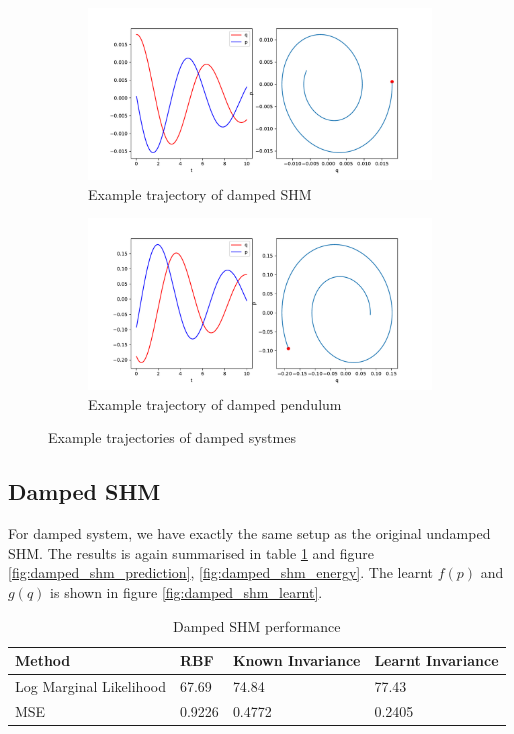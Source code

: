 \documentclass{statsmsc}
\begin{document}
\begin{figure}[H]
     \centering
     \begin{subfigure}[b]{\linewidth}
        \centering
        \includegraphics[width=0.5\linewidth]{../codes/figures/damped_shm_trajectory_1D.pdf}
        \caption{Example trajectory of damped SHM}
        \label{fig:damped_shm_trajectory}
     \end{subfigure}
     \hfill
     \begin{subfigure}[b]{\linewidth}
        \centering
        \includegraphics[width=0.5\linewidth]{../codes/figures/damped_pendulum_trajectory_1D.pdf}
        \caption{Example trajectory of damped pendulum}
        \label{fig:damped_pendulum_trajectory}
     \end{subfigure}
        \caption{Example trajectories of damped systmes}
        \label{fig:damped_trajectory}
\end{figure}

\subsection{Damped SHM}
For damped system, we have exactly the same setup as the original undamped SHM.
The results is again summarised in table \ref{tab:damped_shm_performance} and figure \ref{fig:damped_shm_prediction}, \ref{fig:damped_shm_energy}.
The learnt $f(p)$ and $g(q)$ is shown in figure \ref{fig:damped_shm_learnt}.

\begin{table}[H]
  \centering
  \begin{tabular}{l l l l}
    \hline
Method           & RBF & Known Invariance&  Learnt Invariance\\
  \hline
    Log Marginal Likelihood & 67.69 & 74.84 & 77.43  \\
MSE & 0.9226 & 0.4772 & 0.2405 \\
    \hline
  \end{tabular}
  \caption{Damped SHM performance}
  \label{tab:damped_shm_performance}
\end{table}
\end{document}
